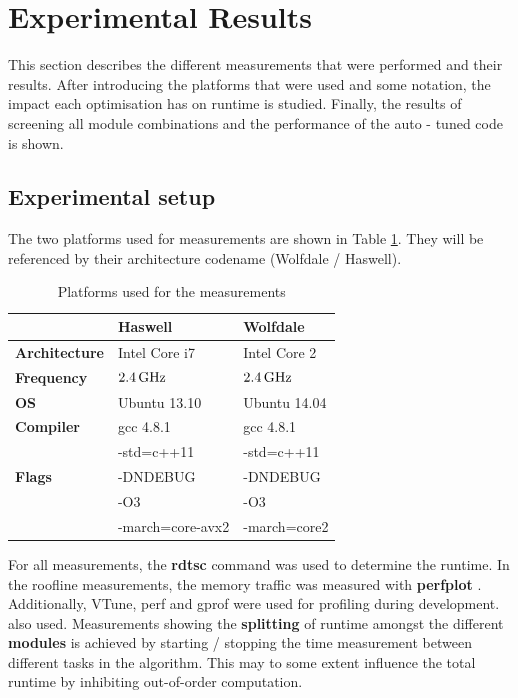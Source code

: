 \documentclass[letterpaper]{article}
\begin{document}
\section{Experimental Results}\label{sec:exp}
This section describes the different measurements that were performed and their results. After introducing the platforms that were used and some notation, the impact each optimisation has on runtime is studied. Finally, the results of screening all module combinations and the performance of the auto - tuned code is shown.
\subsection{Experimental setup} \label{exp:setup}
The two platforms used for measurements are shown in Table \ref{platforms}. They will be referenced by their architecture codename (Wolfdale / Haswell).
\begin{table}[h]
\begin{tabular}{lll}
 & \textbf{Haswell} & \textbf{Wolfdale}\\\hline
\textbf{Architecture} & Intel Core i7 & Intel Core 2\\\hline
\textbf{Frequency} & $\unit[2.4]{GHz}$ & $\unit[2.4]{GHz}$\\\hline
\textbf{OS} & Ubuntu 13.10 & Ubuntu 14.04\\\hline
\textbf{Compiler} & gcc 4.8.1 & gcc 4.8.1\\\hline
 & -std=c++11  & -std=c++11  \\
\textbf{Flags}& -DNDEBUG & -DNDEBUG \\
& -O3  &  -O3 \\
& -march=core-avx2 & -march=core2 \\
\end{tabular}
\caption{Platforms used for the measurements}
\label{platforms}
\end{table}
\newline For all measurements, the \textbf{rdtsc} command was used to determine the runtime. In the roofline measurements, the memory traffic was measured with \textbf{perfplot} \cite{PERFPLOT}. Additionally, VTune, perf and gprof were used for profiling during development.
also used.\newline
Measurements showing the \textbf{splitting} of runtime amongst the different \textbf{modules} is achieved by starting / stopping the time measurement between different tasks in the algorithm. This may to some extent influence the total runtime by inhibiting out-of-order computation.\newline
\end{document}
